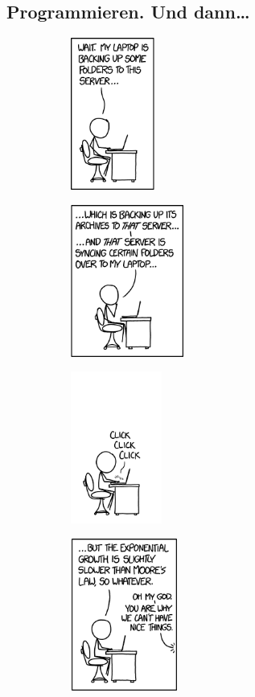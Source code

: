 \subsection{Programmieren. Und dann\dots}

\begin{figure}[b]
    \centering
    \begin{subfigure}{.23\textwidth}
	    \includegraphics[height=5cm]{bilder/backing_up_1.png}
    \end{subfigure}
    \begin{subfigure}{.23\textwidth}
	    \includegraphics[height=5cm]{bilder/backing_up_2.png}
    \end{subfigure}
    \begin{subfigure}{.23\textwidth}
	    \includegraphics[height=5cm]{bilder/backing_up_3.png}
    \end{subfigure}
    \begin{subfigure}{.23\textwidth}
	    \includegraphics[height=5cm]{bilder/backing_up_4.png}
    \end{subfigure}
\end{figure}

